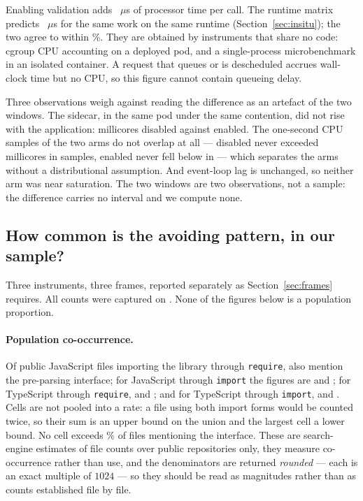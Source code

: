 \documentclass[pdflatex,sn-basic,twocolumn]{sn-jnl}%
\begin{document}
Enabling validation adds \AbCpuPerCallDelta~$\mu$s of processor time per
call. The runtime matrix predicts \InsituPredictedFromMatrix~$\mu$s for the same
work on the same runtime (Section~\ref{sec:insitu}); the two agree to within
\AbCpuVsPredictedPct\%. They are obtained by instruments that share no code:
cgroup CPU accounting on a deployed pod, and a single-process microbenchmark
in an isolated container. A request that queues or is descheduled accrues
wall-clock time but no CPU, so this figure cannot contain queueing delay.

Three observations weigh against reading the difference as an artefact of the
two windows. The sidecar, in the same pod under the same contention, did not
rise with the application: \AbSidecarCpuNone{} millicores disabled against
\AbSidecarCpuJwt{} enabled. The one-second CPU samples of the two arms do not
overlap at all --- disabled never exceeded \AbCpuSampleMaxNone{} millicores in
\AbCpuSamplesNone{} samples, enabled never fell below \AbCpuSampleMinJwt{} in
\AbCpuSamplesJwt{} --- which separates the arms without a distributional
assumption. And event-loop lag is unchanged, so neither arm was near
saturation. The two windows are two observations, not a sample: the difference
carries no interval and we compute none.


\subsection{How common is the avoiding pattern, in our
sample?}\label{sec:prevalence}

Three instruments, three frames, reported separately as Section~\ref{sec:frames}
requires. All counts were captured on \PopCapturedAt. None of the figures below
is a population proportion.

\paragraph{Population co-occurrence.} Of \PopJsRequireFiles{} public JavaScript
files importing the library through \texttt{require},
\PopJsRequireFilesWithApi{} also mention the pre-parsing interface; for
JavaScript through \texttt{import} the figures are \PopJsImportFiles{} and
\PopJsImportFilesWithApi; for TypeScript through \texttt{require},
\PopTsRequireFiles{} and \PopTsRequireFilesWithApi; and for TypeScript through
\texttt{import}, \PopTsImportFiles{} and \PopTsImportFilesWithApi. Cells are not
pooled into a rate: a file using both import forms would be counted twice, so
their sum \PopSumFiles{} is an upper bound on the union and the largest cell
\PopLargestCellFiles{} a lower bound. No cell exceeds \PopWorstCellPct\% of files
mentioning the interface. These are search-engine estimates of file counts over
public repositories only, they measure co-occurrence rather than use, and the
denominators are returned \emph{rounded} --- each is an exact multiple of $1024$
--- so they should be read as magnitudes rather than as counts established file
by file.
\end{document}
